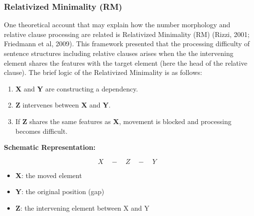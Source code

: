 \documentclass[
]{article}
\providecommand{\tightlist}{%
  \setlength{\itemsep}{0pt}\setlength{\parskip}{0pt}}
\begin{document}
\subsubsection{Relativized Minimality
(RM)}\label{relativized-minimality-rm}

One theoretical account that may explain how the number morphology and
relative clause processing are related is Relativized Minimality (RM)
(Rizzi, 2001; Friedmann et al, 2009). This framework presented that the
processing difficulty of sentence structures including relative clauses
arises when the the intervening element shares the features with the
target element (here the head of the relative clause). The brief logic
of the Relativized Minimality is as follows:

\vspace{1em}

\begin{enumerate}
\def\labelenumi{\arabic{enumi}.}
\tightlist
\item
  \textbf{X} and \textbf{Y} are constructing a dependency.
\item
  \textbf{Z} intervenes between \textbf{X} and \textbf{Y}.
\item
  If \textbf{Z} shares the same features as \textbf{X}, movement is
  blocked and processing becomes difficult.
\end{enumerate}

\textbf{Schematic Representation:}

\[
X \quad - \quad Z \quad - \quad Y
\]

\begin{itemize}
\tightlist
\item
  \textbf{X}: the moved element\\
\item
  \textbf{Y}: the original position (gap)\\
\item
  \textbf{Z}: the intervening element between X and Y
\end{itemize}

\vspace{1em}
\end{document}
